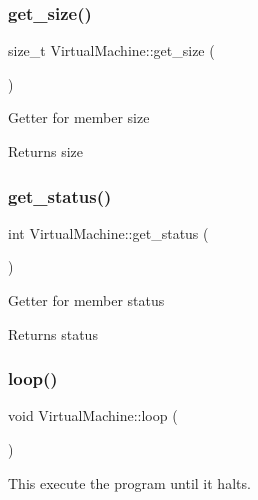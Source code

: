 \subsubsection{\texorpdfstring{get\+\_\+size()}{get\_size()}}
{\footnotesize\ttfamily size\+\_\+t Virtual\+Machine\+::get\+\_\+size (\begin{DoxyParamCaption}{ }\end{DoxyParamCaption})}

Getter for member size \begin{DoxyReturn}{Returns}
size 
\end{DoxyReturn}
\mbox{\label{classVirtualMachine_ac93b4e3d667d479eab4193e38e59ec65}} 
\subsubsection{\texorpdfstring{get\+\_\+status()}{get\_status()}}
{\footnotesize\ttfamily int Virtual\+Machine\+::get\+\_\+status (\begin{DoxyParamCaption}{ }\end{DoxyParamCaption})}

Getter for member status \begin{DoxyReturn}{Returns}
status 
\end{DoxyReturn}
\mbox{\label{classVirtualMachine_a85bd42167c75161f0dad72349214707c}} 
\subsubsection{\texorpdfstring{loop()}{loop()}}
{\footnotesize\ttfamily void Virtual\+Machine\+::loop (\begin{DoxyParamCaption}{ }\end{DoxyParamCaption})\hspace{0.3cm}{\ttfamily [virtual]}}

This execute the program until it halts. \mbox{\label{classVirtualMachine_ab12bb31d1f511018a0a8e956efb72591}} 
